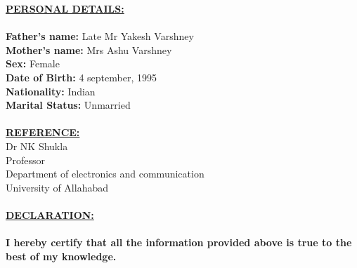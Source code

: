 \documentclass{article}
\begin{document}
				\underline{\textbf{PERSONAL DETAILS:}}\\
				\\
				\textbf{Father's name:} Late Mr Yakesh Varshney\\
				\textbf{Mother's name:} Mrs Ashu Varshney\\
				\textbf{Sex:} Female\\
				\textbf{Date of Birth:} 4 september, 1995\\
				\textbf{Nationality:} Indian\\
				\textbf{Marital Status:} Unmarried\\
				\\
					\underline{\textbf{REFERENCE:}}
					\\[\baselineskip]
					Dr NK Shukla\\
					Professor\\
					Department of electronics and communication\\
					University of Allahabad\\
					\\
						\underline{\textbf{DECLARATION:}}\\
						\\
						\textbf{I hereby certify that all the information provided above is true to the best of my knowledge.}\\
						\\			
			
\end{document}
